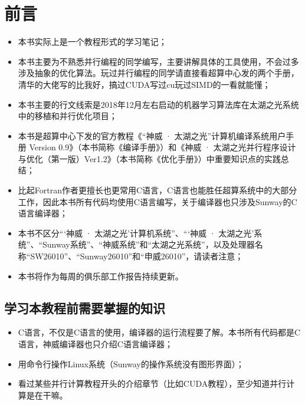 \maketitle%
\MAKETITLE%
\intobmk\chapter*{前\quad 言}%
\setcounter{page}{1}%
\begin{itemize}
    \item 本书实际上是一个教程形式的学习笔记；
    \item 本书主要为不熟悉并行编程的同学编写，主要讲解具体的工具使用，不会过多涉及抽象的优化算法。玩过并行编程的同学请直接看超算中心发的两个手册，清华的大佬写的比我好，搞过CUDA写过cu玩过SIMD的一看就能懂；
    \item 本书主要的行文线索是2018年12月左右启动的机器学习算法库在太湖之光系统中的移植和并行优化项目；
    \item 本书是超算中心下发的官方教程《“神威 · 太湖之光”计算机编译系统用户手册 Version 0.9》（本书简称《编译手册》）和《神威 · 太湖之光并行程序设计与优化（第一版）Ver1.2》（本书简称《优化手册》）中重要知识点的实践总结；
    \item 比起Fortran作者更擅长也更常用C语言，C语言也能胜任超算系统中的大部分工作，因此本书所有代码均使用C语言编写，关于编译器也只涉及Sunway的C语言编译器；
    \item 本书不区分“‘神威 · 太湖之光’计算机系统”、“‘神威 · 太湖之光’系统”、“Sunway系统”、“神威系统”和“太湖之光系统”，以及处理器名称“SW26010”、“Sunway26010”和“申威26010”，请读者注意；
    \item 本书将作为每周的俱乐部工作报告持续更新。
\end{itemize}

\section*{学习本教程前需要掌握的知识}
\begin{itemize}
    \item C语言，不仅是C语言的使用，编译器的运行流程要了解。本书所有代码都是C语言，神威编译器也只介绍C语言编译器；
    \item 用命令行操作Linux系统（Sunway的操作系统没有图形界面）；
    \item 看过某些并行计算教程开头的介绍章节（比如CUDA教程），至少知道并行计算是在干嘛。
\end{itemize}

